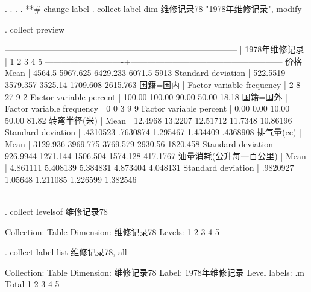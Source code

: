 \documentclass{ctexart}
\begin{document}
. 
. 
. 
. **# change label          
. collect label dim 维修记录78 "1978年维修记录", modify

. collect preview

-----------------------------------------------------------------------------------
                            |                     1978年维修记录                   
                            |         1          2          3          4          5
----------------------------+------------------------------------------------------
价格                        |                                                      
  Mean                      |    4564.5   5967.625   6429.233     6071.5       5913
  Standard deviation        |  522.5519   3579.357    3525.14   1709.608   2615.763
国籍=国内                   |                                                      
  Factor variable frequency |         2          8         27          9          2
  Factor variable percent   |    100.00     100.00      90.00      50.00      18.18
国籍=国外                   |                                                      
  Factor variable frequency |         0          0          3          9          9
  Factor variable percent   |      0.00       0.00      10.00      50.00      81.82
转弯半径(米)                |                                                      
  Mean                      |   12.4968    13.2207   12.51712    11.7348   10.86196
  Standard deviation        |  .4310523   .7630874   1.295467   1.434409   .4368908
排气量(cc)                  |                                                      
  Mean                      |  3129.936   3969.775   3769.579    2930.56   1820.458
  Standard deviation        |  926.9944   1271.144   1506.504   1574.128   417.1767
油量消耗(公升每一百公里)    |                                                      
  Mean                      |  4.861111   5.408139   5.384831   4.873404   4.048131
  Standard deviation        |  .9820927    1.05648   1.211085   1.226599   1.382546
-----------------------------------------------------------------------------------

. collect levelsof 维修记录78

Collection: Table
 Dimension: 维修记录78
    Levels: 1 2 3 4 5

. collect label list 维修记录78, all

  Collection: Table
   Dimension: 维修记录78
       Label: 1978年维修记录
Level labels:
          .m  Total
           1  
           2  
           3  
           4  
           5  
\end{document}
